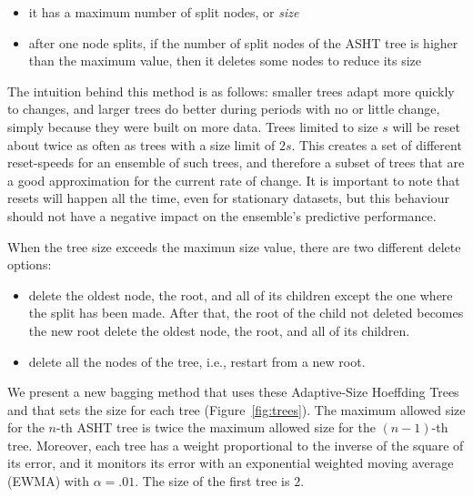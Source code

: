 \begin{itemize}
\item it has a maximum number of split nodes, or {\em size}
\item after one node splits, if the number of split nodes of the ASHT tree is higher than the
maximum value, then it deletes some nodes to reduce its size
\end{itemize}

The intuition behind this method is as follows: smaller trees adapt more quickly to changes,
and larger trees do better during periods with no or little change,
simply because they were built on more data.
Trees limited to size $s$ will be reset about twice as often as
trees with a size limit of $2s$.
This creates a set of different reset-speeds for an ensemble of such trees, and
therefore a subset of trees that are a good approximation for the current rate of change. 
It is important to note that resets will happen all the time, even for stationary datasets,
but this behaviour should not have a negative impact on the ensemble's predictive performance.

When the tree size exceeds
the maximun size value, there are two different delete options:
\begin{itemize}
 \item delete the oldest node, the root, and all of its children %
except the one where the split has
been made. After that, the root of the
child not deleted becomes the new root
delete the oldest node, the root, and all of its children.

 \item delete all the nodes of the tree, i.e., restart from a new root.
\end{itemize}



We present a new bagging method that uses these Adaptive-Size Hoeffding Trees
and that sets the size for each tree (Figure~\ref{fig:trees}). 
The maximum allowed size for the $n$-th ASHT tree is
twice the maximum allowed size for the $(n-1)$-th tree. Moreover, each tree
has a weight proportional to the inverse of the square of its error, and
it monitors its error
with an exponential weighted moving average (EWMA) with $\alpha=.01$. The size of the first tree is $2$. 

